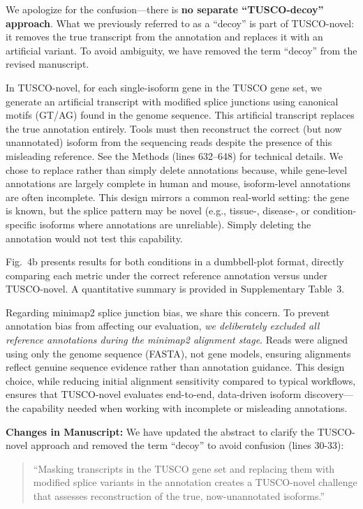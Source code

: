 \documentclass[11pt]{article}
\begin{document}
\begin{responseboxnew}
We apologize for the confusion---there is \textbf{no separate ``TUSCO-decoy'' approach}. What we previously referred to as a ``decoy'' is part of TUSCO-novel: it removes the true transcript from the annotation and replaces it with an artificial variant. To avoid ambiguity, we have removed the term ``decoy'' from the revised manuscript.

In TUSCO-novel, for each single-isoform gene in the TUSCO gene set, we generate an artificial transcript with modified splice junctions using canonical motifs (GT/AG) found in the genome sequence. This artificial transcript replaces the true annotation entirely. Tools must then reconstruct the correct (but now unannotated) isoform from the sequencing reads despite the presence of this misleading reference. See the Methods (lines 632--648) for technical details. We chose to replace rather than simply delete annotations because, while gene-level annotations are largely complete in human and mouse, isoform-level annotations are often incomplete. This design mirrors a common real-world setting: the gene is known, but the splice pattern may be novel (e.g., tissue-, disease-, or condition-specific isoforms where annotations are unreliable). Simply deleting the annotation would not test this capability.

Fig.~4b presents results for both conditions in a dumbbell-plot format, directly comparing each metric under the correct reference annotation versus under TUSCO-novel. A quantitative summary is provided in Supplementary Table~3.

Regarding minimap2 splice junction bias, we share this concern. To prevent annotation bias from affecting our evaluation, \textit{we deliberately excluded all reference annotations during the minimap2 alignment stage}. Reads were aligned using only the genome sequence (FASTA), not gene models, ensuring alignments reflect genuine sequence evidence rather than annotation guidance. This design choice, while reducing initial alignment sensitivity compared to typical workflows, ensures that TUSCO-novel evaluates end-to-end, data-driven isoform discovery---the capability needed when working with incomplete or misleading annotations.

\vspace{0.3cm}
\textbf{Changes in Manuscript:} We have updated the abstract to clarify the TUSCO-novel approach and removed the term ``decoy'' to avoid confusion (lines 30-33):
\begin{quote}
``Masking transcripts in the TUSCO gene set and replacing them with modified splice variants in the annotation creates a TUSCO-novel challenge that assesses reconstruction of the true, now-unannotated isoforms.''
\end{quote}
\end{responseboxnew}
\end{document}

